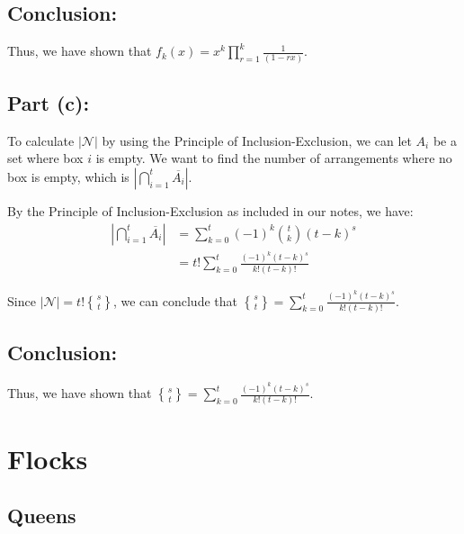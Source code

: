 \documentclass[answers]{exam}
\newcommand{\stirling}[2]{\genfrac{\{}{\}}{0pt}{}{#1}{#2}}
\begin{document}
\begin{questions}
\begin{solution}
			\subsection*{Conclusion:}
			Thus, we have shown that $f_k(x) = x^k \prod_{r=1}^{k} \frac{1}{(1-rx)}$.

			\subsection*{Part (c):}
			To calculate $|\mathcal{N}|$ by using the Principle of Inclusion-Exclusion, we can let $A_i$ be a set where box $i$ is empty. We want to find the number of arrangements where no box is empty, which is $|\bigcap_{i=1}^t \overline{A_i}|$.

			By the Principle of Inclusion-Exclusion as included in our notes, we have:
			\begin{align*}
				|\bigcap_{i=1}^t \overline{A_i}| &= \sum_{k=0}^t (-1)^k \binom{t}{k} (t-k)^s \\
				&= t! \sum_{k=0}^t \frac{(-1)^k (t-k)^s}{k! (t-k)!}
			\end{align*}

			 Since $|\mathcal{N}| = t!\stirling{s}{t}$, we can conclude that $\stirling{s}{t} = \sum_{k=0}^t \frac{(-1)^k (t-k)^s}{k! (t-k)!}$.
			\subsection*{Conclusion:}
			Thus, we have shown that $\stirling{s}{t} = \sum_{k=0}^t \frac{(-1)^k (t-k)^s}{k! (t-k)!}$.
			

		\end{solution}
	\end{questions}


	\section{Flocks}
	
	
	\subsection*{Queens}
	
\end{document}
